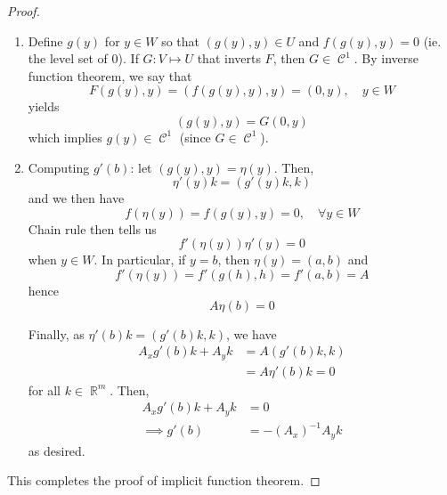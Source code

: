 \documentclass{amsart} %
\theoremstyle{mytheoremstyle}
\theoremstyle{definition}
\numberwithin{equation}{section}
\DeclareMathOperator{\R}{\mathbb{R}}
\DeclareMathOperator{\1}{\mathbbm{1}}
\DeclareMathOperator{\contf}{\mathcal{C}}
\begin{document}
\begin{proof}
\begin{enumerate}[label=(\arabic*)]
		
		\item Define $g(y)$ for $y \in W$ so that $(g(y),y) \in U$ and $f(g(y),y) =0$ (ie. the level set of $0$). If $G : V \mapsto U$ that inverts $F$, then $G \in \contf^1$. By inverse function theorem, we say that
		$$ F(g(y),y) = (f(g(y),y),y) = (0,y), \quad y \in W $$
		yields
		$$ (g(y),y) = G(0,y) $$
		which implies $g(y) \in \contf^1$ (since $G \in \contf^1$).
		
		
		\item Computing $g'(b)$: let $(g(y),y) = \eta (y)$. Then, 
		$$ \eta'(y) k = (g'(y)k,k) $$
		and we then have 
		$$ f(\eta(y) ) = f(g(y),y) = 0 , \quad \forall y \in W$$
		Chain rule then tells us
		$$ f'(\eta(y)) \eta'(y) = 0 $$
		when $y \in W$. In particular, if $y =b$, then $\eta (y) = (a,b) $ and
		$$ f'(\eta (y) ) = f' (g(h),h) = f'(a,b) = A $$
		hence
		$$ A \eta (b) = 0 $$
		
		Finally, as $\eta'(b) k = (g'(b) k,k)$, we have
		\begin{align*}
		A_x g'(b)k + A_y k &= A(g'(b)k,k) \\
		&= A \eta'(b) k =0
		\end{align*}
		for all $k \in \R^m$. Then,
		\begin{align*}
		A_x g'(b)k + A_y k & = 0 \\
		\implies g'(b) &= -(A_x)^{-1} A_y k
		\end{align*}
		as desired.
	\end{enumerate} 
	
	This completes the proof of implicit function theorem.
\end{proof}
\end{document}
